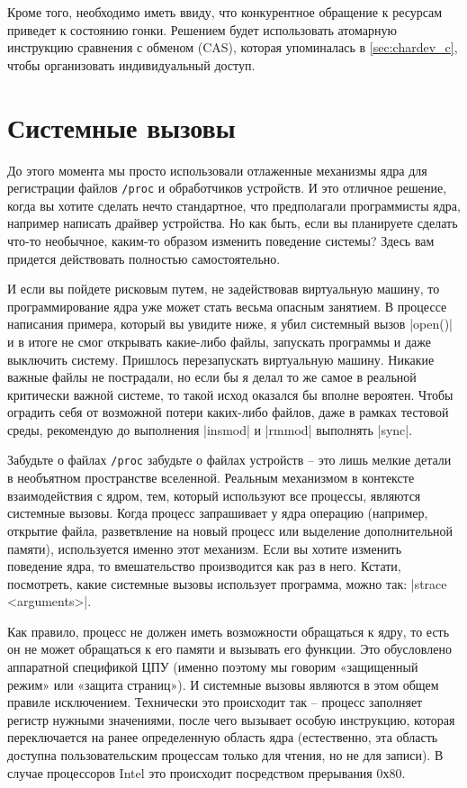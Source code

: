 \documentclass[10pt, oneside]{book}
\begin{document}
Кроме того, необходимо иметь ввиду, что конкурентное обращение к ресурсам приведет к
состоянию гонки. Решением будет использовать атомарную инструкцию сравнения с
обменом (CAS), которая упоминалась в \ref{sec:chardev_c}, чтобы организовать индивидуальный доступ.




\section{Системные вызовы}
\label{sec:syscall}
До этого момента мы просто использовали отлаженные механизмы ядра для регистрации файлов \verb|/proc| и обработчиков устройств. И это отличное решение, когда вы хотите сделать нечто стандартное, что предполагали программисты ядра, например написать драйвер устройства. Но как быть, если вы планируете сделать что-то необычное, каким-то образом изменить поведение системы? Здесь вам придется действовать полностью самостоятельно.

И если вы пойдете рисковым путем, не задействовав виртуальную машину, то программирование ядра уже может стать весьма опасным занятием. В процессе
написания примера, который вы увидите ниже, я убил системный вызов \cpp|open()| и в итоге не смог открывать какие-либо файлы, запускать программы и даже выключить систему. Пришлось перезапускать виртуальную машину. Никакие важные файлы не пострадали, но если бы я делал то же самое в реальной критически важной системе, то такой исход оказался бы вполне вероятен. Чтобы оградить себя от возможной потери каких-либо файлов, даже в рамках тестовой среды, рекомендую до выполнения \sh|insmod| и \sh|rmmod| выполнять \sh|sync|.

Забудьте о файлах \verb|/proc| забудьте о файлах устройств – это лишь мелкие детали в необъятном пространстве вселенной. Реальным механизмом в контексте взаимодействия с ядром, тем, который используют все процессы, являются системные вызовы. Когда процесс запрашивает у ядра операцию (например, открытие файла, разветвление на новый процесс или выделение дополнительной памяти), используется именно этот механизм.
Если вы хотите изменить поведение ядра, то вмешательство производится как раз в него.
Кстати, посмотреть, какие системные вызовы использует программа, можно так: \sh|strace <arguments>|.

Как правило, процесс не должен иметь возможности обращаться к ядру, то есть он не может обращаться к его памяти и вызывать его функции. Это обусловлено аппаратной спецификой ЦПУ (именно поэтому мы говорим «защищенный режим» или «защита страниц»).
И системные вызовы являются в этом общем правиле исключением. Технически это происходит так – процесс заполняет регистр нужными значениями, после чего вызывает особую инструкцию, которая переключается на ранее определенную область ядра (естественно, эта область доступна пользовательским процессам только для чтения, но не для записи). В случае процессоров Intel это происходит посредством прерывания 0х80.
\end{document}
